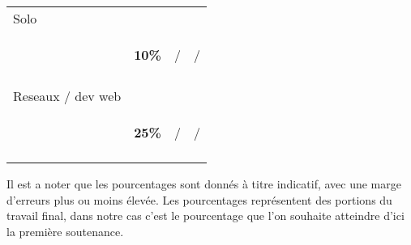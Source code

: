\documentclass[12pt]{report}
\begin{document}
\begin{center}
\begin{tabular}{|p{2 cm}||p{2.5cm}|p{2.5cm}|p{2.5cm}|}
                 & & &
                \\
            \hline Solo
                & & &
                \\
                & \begin{center}
                     \textbf{\Huge10\%}
                \end{center}
                & \begin{center}
                    /
                \end{center} & \begin{center}
                    /
                \end{center}
                \\ & & &
                \\
            \hline Reseaux / dev web
                 & & &
                \\
                & \begin{center}
                 \textbf{\Huge25\%}
                \end{center}
                & \begin{center}
                    /
                \end{center} & \begin{center}
                    /
                \end{center} 
                \\
                    & & &
                \\
            \hline
            \end{tabular}
        \end{center}
        Il est a noter que les pourcentages sont donnés à titre indicatif, avec une marge d’erreurs plus ou moins élevée. Les pourcentages représentent des portions du travail final, dans notre cas c’est le pourcentage que l’on souhaite atteindre d’ici la première soutenance.
\end{document}
